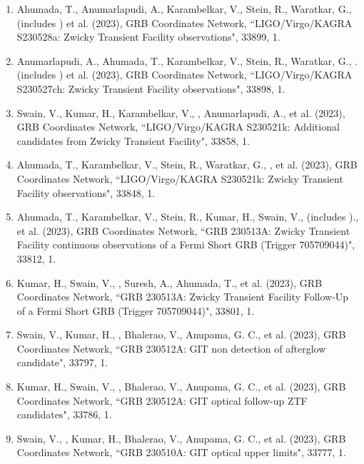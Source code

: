 \begin{enumerate}
\item Ahumada, T., Anumarlapudi, A., Karambelkar, V., Stein, R., Waratkar, G., (includes \me) et al. (2023), GRB Coordinates Network, {``LIGO/Virgo/KAGRA S230528a: Zwicky Transient Facility observations"}, 33899, 1.

\item Anumarlapudi, A., Ahumada, T., Karambelkar, V., Stein, R., Waratkar, G., .(includes \me) et al. (2023), GRB Coordinates Network, {``LIGO/Virgo/KAGRA S230527ch: Zwicky Transient Facility observations"}, 33898, 1.

\item Swain, V., Kumar, H., Karambelkar, V., \me, Anumarlapudi, A., et al. (2023), GRB Coordinates Network, {``LIGO/Virgo/KAGRA S230521k: Additional candidates from Zwicky Transient Facility"}, 33858, 1.

\item Ahumada, T., Karambelkar, V., Stein, R., Waratkar, G., \me, et al. (2023), GRB Coordinates Network, {``LIGO/Virgo/KAGRA S230521k: Zwicky Transient Facility observations"}, 33848, 1.

\item Ahumada, T., Karambelkar, V., Stein, R., Kumar, H., Swain, V., (includes \me)., et al. (2023), GRB Coordinates Network, {``GRB 230513A: Zwicky Transient Facility continuous observations of a Fermi Short GRB (Trigger 705709044)"}, 33812, 1.

\item Kumar, H., Swain, V., \me, Suresh, A., Ahumada, T., et al. (2023), GRB Coordinates Network, {``GRB 230513A: Zwicky Transient Facility Follow-Up of a Fermi Short GRB (Trigger 705709044)"}, 33801, 1.

\item Swain, V., Kumar, H., \me, Bhalerao, V., Anupama, G. C., et al. (2023), GRB Coordinates Network, {``GRB 230512A: GIT non detection of afterglow candidate"}, 33797, 1.

\item Kumar, H., Swain, V., \me, Bhalerao, V., Anupama, G. C., et al. (2023), GRB Coordinates Network, {``GRB 230512A: GIT optical follow-up ZTF candidates"}, 33786, 1.

\item Swain, V., \me, Kumar, H., Bhalerao, V., Anupama, G. C., et al. (2023), GRB Coordinates Network, {``GRB 230510A: GIT optical upper limits"}, 33777, 1.

\end{enumerate}